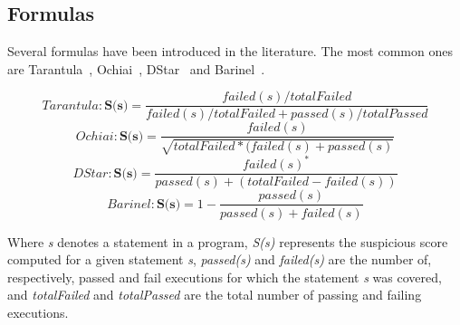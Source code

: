 \subsection{Formulas}

Several formulas have been introduced in the literature. The most common ones are Tarantula~\cite{tarantula}, Ochiai~\cite{Abreu:2006yf}, DStar~\cite{wong-dstar} and Barinel~\cite{abreu2009spectrum}.

    \[
    Tarantula: \textbf{S(s)} = \frac{failed(s) / totalFailed}{failed(s) / totalFailed + passed(s) / totalPassed}
    \]
    \[
    Ochiai: \textbf{S(s)} = \frac{failed(s)}{\sqrt{totalFailed * (failed(s) + passed(s)}}
    \]
    \[
    DStar: \textbf{S(s)} = \frac{failed(s)^*}{passed(s) + (totalFailed - failed(s))}
    \]
    \[
    Barinel: \textbf{S(s)} = 1 - \frac{passed(s)}{passed(s) + failed(s)}
    \]

Where \textit{s} denotes a statement in a program, \textit{S(s)} represents the suspicious score computed for a given statement \textit{s}, \textit{passed(s)} and \textit{failed(s)} are the number of, respectively, passed and fail executions for which the statement \textit{s} was covered, and \textit{totalFailed} and \textit{totalPassed} are the total number of passing and failing executions.